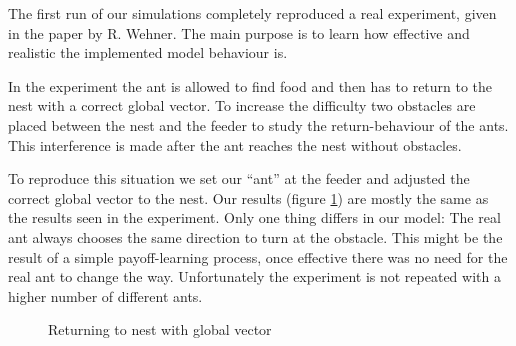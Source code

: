 \documentclass[11pt]{article}
\begin{document}
The first run of our simulations completely reproduced a real experiment, given in the paper by R. Wehner\cite{wehner03}. The main purpose is to learn how effective and realistic the implemented model behaviour is.

In the experiment the ant is allowed to find food and then has to return to the nest with a correct global vector. To increase the difficulty two obstacles are placed between the nest and the feeder to study the return-behaviour of the ants. This interference is made after the ant reaches the nest without obstacles.

To reproduce this situation we set our “ant” at the feeder and adjusted the correct global vector to the nest. Our results (figure \ref{fig7}) are mostly the same as the results seen in the experiment. Only one thing differs in our model: The real ant always chooses the same direction to turn at the obstacle. This might be the result of a simple payoff-learning process, once effective there was no need for the real ant to change the way. Unfortunately the experiment is not repeated with a higher number of different ants.

\begin{figure}
   \centering
   \hspace{1cm}
   \caption{Returning to nest with global vector}
\label{fig7}
\end{figure}
\end{document}
